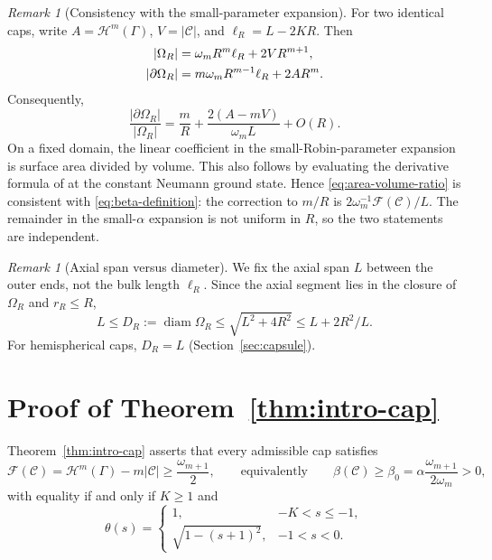 \documentclass[11pt,a4paper]{article}
\numberwithin{equation}{section}
\theoremstyle{paperplain}
\theoremstyle{remark}
\newtheorem{remark}[theorem]{Remark}
\newcommand{\C}{\mathcal{C}}
\newcommand{\HH}{\mathcal{H}}
\newcommand{\diam}{\operatorname{diam}}
\begin{document}
\begin{remark}[Consistency with the small-parameter expansion]\label{rem:small-alpha}
For two identical caps, write $A=\HH^m(\Gamma)$, $V=|\C|$, and
$\ell_R=L-2KR$. Then
\begin{align}
 |\Omega_R|&=\omega_m R^m\ell_R+2VR^{m+1},\notag\\
 |\partial\Omega_R|&=m\omega_mR^{m-1}\ell_R+2AR^m.\label{eq:area-volume}
\end{align}
Consequently,
\begin{equation}\label{eq:area-volume-ratio}
 \frac{|\partial\Omega_R|}{|\Omega_R|}
 =\frac mR+\frac{2(A-mV)}{\omega_m L}+O(R).
\end{equation}
On a fixed domain, the linear coefficient in the small-Robin-parameter
expansion is surface area divided by volume. This also follows by evaluating
the derivative formula of \cite[Proposition 3.1]{ACH} at the constant Neumann
ground state. Hence \eqref{eq:area-volume-ratio} is consistent with
\eqref{eq:beta-definition}: the correction to $m/R$ is
$2\omega_m^{-1}\mathcal F(\C)/L$. The remainder in the small-$\alpha$ expansion is not uniform in $R$, so
the two statements are independent.
\end{remark}

\begin{remark}[Axial span versus diameter]\label{rem:length}
We fix the axial span $L$ between the outer ends, not the bulk length
$\ell_R$. Since the axial segment lies in the closure of $\Omega_R$ and
$r_R\le R$,
\begin{equation}\label{eq:diam-bound}
 L\le D_R:=\diam\Omega_R\le\sqrt{L^2+4R^2}\le L+2R^2/L.
\end{equation}
For hemispherical caps, $D_R=L$ (Section~\ref{sec:capsule}).
\end{remark}

\section{Proof of Theorem~\ref{thm:intro-cap}}\label{sec:calibration}

Theorem~\ref{thm:intro-cap} asserts that every admissible cap satisfies
\begin{equation}\label{eq:sharp-geometric}
 \mathcal F(\C)=\HH^m(\Gamma)-m|\C|\ge\frac{\omega_{m+1}}2,
 \qquad\text{equivalently}\qquad
 \beta(\C)\ge\beta_0=\alpha\frac{\omega_{m+1}}{2\omega_m}>0,
\end{equation}
with equality if and only if $K\ge1$ and
\begin{equation}\label{eq:equality-profile}
 \theta(s)=
 \begin{cases}
 1,&-K<s\le-1,\\
 \sqrt{1-(s+1)^2},&-1<s<0.
 \end{cases}
\end{equation}
\end{document}
